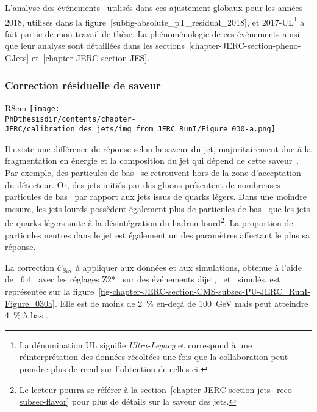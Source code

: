 \par L'analyse des événements \Gjet\ utilisés dans ces ajustement globaux pour les années 2018, utilisés dans la figure~\ref{subfig-absolute_pT_residual_2018}, et 2017-UL\footnote{La dénomination \og UL \fg{} signifie \emph{Ultra-Legacy} et correspond à une réinterprétation des données récoltées une fois que la collaboration peut prendre plus de recul sur l'obtention de celles-ci.} a fait partie de mon travail de thèse.
La phénoménologie de ces événements ainsi que leur analyse sont détaillées dans les sections~\ref{chapter-JERC-section-pheno-GJets} et~\ref{chapter-JERC-section-JES}.
\subsubsection{Correction résiduelle de saveur}\label{chapter-JERC-section-CMS-subsec-residuals_flavor}
\begin{wrapfigure}{R}{8cm}
\centering
\vspace{-2\baselineskip}
\texttt{[image: \\PhDthesisdir/contents/chapter-JERC/calibration\_des\_jets/img\_from\_JERC\_RunI/Figure\_030-a.png]}
\caption[Correction résiduelle de saveur en fonction de l'impulsion du jet.]{Correction résiduelle de saveur en fonction de l'impulsion du jet préalablement corrigée par les corrections décrites dans les sections précédantes, $\pT_\cali$, pour des jets de pseudo-rapidité $\abs{\eta}<\num{1.3}$~\cite{JERC_RunI}.}
\label{fig-chapter-JERC-section-CMS-subsec-PU-JERC_RunI-Figure_030a}
\end{wrapfigure}
Il existe une différence de réponse selon la saveur du jet, majoritairement due à la fragmentation en énergie et la composition du jet qui dépend de cette saveur~\cite{JERC_RunI}.
Par exemple, des particules de bas \pT\ se retrouvent hors de la zone d'acceptation du détecteur.
Or, des jets initiés par des gluons présentent de nombreuses particules de bas \pT\ par rapport aux jets issus de quarks légers.
Dans une moindre mesure, les jets lourds possèdent également plus de particules de bas \pT\ que les jets de quarks légers suite à la désintégration du hadron lourd\footnote{Le lecteur pourra se référer à la section~\ref{chapter-JERC-section-jets_reco-subsec-flavor} pour plus de détails sur la saveur des jets.}.
La proportion de particules neutres dans le jet est également un des paramètres affectant le plus sa réponse.
\par La correction $\mathcal{C}_\text{Sav}$ à appliquer aux données et aux simulations, obtenue à l'aide de
\PYTHIA~6.4~\cite{pythia6.4}
avec les réglages Z2*~\cite{Khachatryan:2015pea}
sur des événements dijet, \Zjet\ et \Gjet\ simulés,
est représentée sur la figure~\ref{fig-chapter-JERC-section-CMS-subsec-PU-JERC_RunI-Figure_030a}.
Elle est de moins de \SI{2}{\%} en-deçà de \SI{100}{\GeV} mais peut atteindre \SI{4}{\%} à bas \pT.
